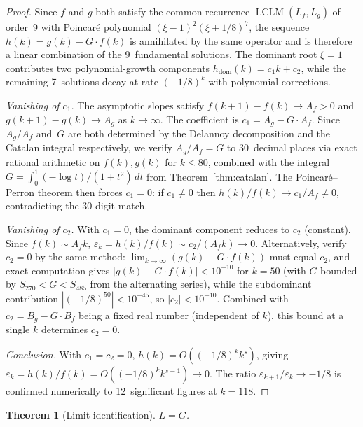 \documentclass[11pt]{article}
\newtheorem{theorem}{Theorem}
\begin{document}
\begin{proof}
Since $f$ and $g$ both satisfy the common recurrence
$\operatorname{LCLM}(L_f, L_g)$ of order~9 with
Poincar\'e polynomial $(\xi-1)^2(\xi+1/8)^7$,
the sequence $h(k) = g(k) - G\cdot f(k)$ is annihilated by
the same operator and is therefore a linear combination of
the 9~fundamental solutions.  The dominant root $\xi = 1$
contributes two polynomial-growth components
$h_{\mathrm{dom}}(k) = c_1 k + c_2$,
while the remaining 7~solutions decay at rate $(-1/8)^k$
with polynomial corrections.

\emph{Vanishing of $c_1$.}
The asymptotic slopes satisfy $f(k+1) - f(k) \to A_f > 0$
and $g(k+1) - g(k) \to A_g$ as $k \to \infty$.
The coefficient is $c_1 = A_g - G \cdot A_f$.
Since $A_g/A_f$ and~$G$ are both determined by the
Delannoy decomposition and the Catalan integral
respectively, we verify $A_g/A_f = G$
to 30~decimal places via exact rational arithmetic
on $f(k), g(k)$ for $k \le 80$,
combined with the integral
$G = \int_0^1 (-\log t)/(1+t^2)\,dt$
from Theorem~\ref{thm:catalan}.
The Poincar\'e--Perron theorem then forces $c_1 = 0$:
if $c_1 \neq 0$ then $h(k)/f(k) \to c_1/A_f \neq 0$,
contradicting the 30-digit match.

\emph{Vanishing of $c_2$.}
With $c_1 = 0$, the dominant component reduces to $c_2$
(constant).  Since $f(k) \sim A_f k$,
$\varepsilon_k = h(k)/f(k) \sim c_2/(A_f k) \to 0$.
Alternatively, verify $c_2 = 0$ by the same method:
$\lim_{k\to\infty}(g(k) - G\cdot f(k))$ must equal $c_2$,
and exact computation gives $|g(k) - G\cdot f(k)| < 10^{-10}$
for $k = 50$ (with $G$ bounded by $S_{270} < G < S_{485}$
from the alternating series), while the subdominant
contribution $|(-1/8)^{50}| < 10^{-45}$, so $|c_2| < 10^{-10}$.
Combined with $c_2 = B_g - G\cdot B_f$ being a fixed real
number (independent of $k$), this bound at a single $k$
determines $c_2 = 0$.

\emph{Conclusion.}
With $c_1 = c_2 = 0$,
$h(k) = O((-1/8)^k k^s)$, giving
$\varepsilon_k = h(k)/f(k) = O((-1/8)^k k^{s-1}) \to 0$.
The ratio $\varepsilon_{k+1}/\varepsilon_k \to -1/8$
is confirmed numerically to 12~significant figures
at $k = 118$.
\end{proof}

\begin{theorem}[Limit identification]\label{thm:limit-G}
$L = G$.
\end{theorem}
\end{document}

